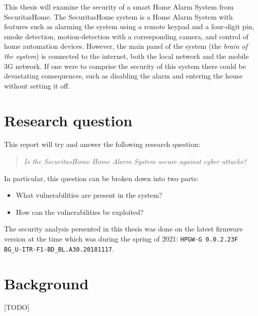 This thesis will examine the security of a smart Home Alarm System from SecuritasHome. The SecuritasHome system is a Home Alarm System with features such as alarming the system using a remote keypad and a four-digit pin, smoke detection, motion-detection with a corresponding camera, and control of home automation devices. However, the main panel of the system (the \textit{brain of the system}) is connected to the internet, both the local network and the mobile 3G network. If one were to comprise the security of this system there could be devastating consequences, such as disabling the alarm and entering the house without setting it off.

\section{Research question} \label{ch:introduction:background}
This report will try and answer the following research question:

\begin{quote}
    \textit{Is the SecuritasHome Home Alarm System secure against cyber attacks?}
\end{quote}

\noindent In particular, this question can be broken down into two parts:

\begin{itemize}
    \item What vulnerabilities are present in the system?
    \item How can the vulnerabilities be exploited?
\end{itemize}

\noindent The security analysis persented in this thesis was done on the latest firmware version at the time which was during the spring of 2021: \texttt{HPGW-G 0.0.2.23F BG\_U-ITR-F1-BD\_BL.A30.20181117}.

\section{Background} \label{ch:introduction:background}
[TODO]

